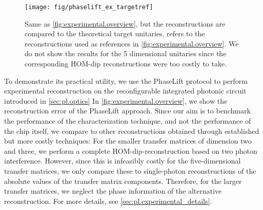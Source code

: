 \begin{figure*}[tbp]
  \centering
  \texttt{[image: fig/phaselift\_ex\_targetref]}
  \caption{%
     \label{fig:experimental.targetref}%
     Same as \cref{fig:experimental.overview}, but the reconstructions are compared to the theoretical target unitaries.
      refers to the reconstructions used as references in \cref{fig:experimental.overview}.
     We do not show the results for the 5 dimensional unitaries since the corresponding HOM-dip reconstructions were too costly to take.
  }
\end{figure*}

To demonstrate its practical utility, we use the PhaseLift protocol to perform experimental reconstruction on the reconfigurable integrated photonic circuit introduced in \cref{sec:pl.optics}
In \cref{fig:experimental.overview}, we show the reconstruction error of the PhaseLift approach.
Since our aim is to benchmark the performance of the characterization technique, and not the performance of the chip itself, we compare to  other reconstructions obtained through established but more costly techniques:
For the smaller transfer matrices of dimension two and three, we perform a complete HOM-dip-reconstruction based on two photon interference.
However, since this is infeasibly costly for the five-dimensional transfer matrices, we only compare these to single-photon reconstructions of the absolute values of the transfer matrix components.
Therefore, for the larger transfer matrices, we neglect the phase information of the alternative reconstruction.
For more details, see \cref{sec:pl.experimental_details}.

